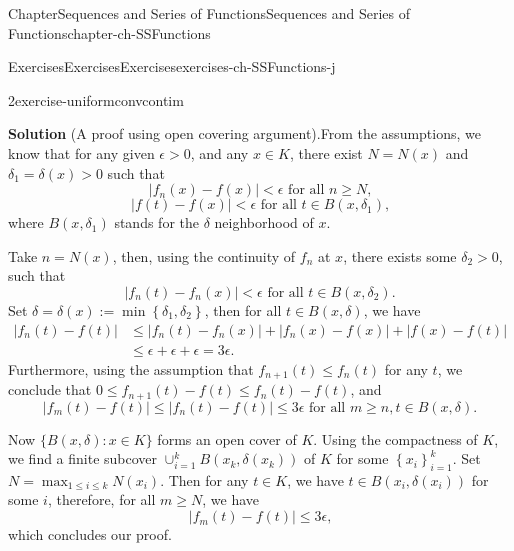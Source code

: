 \documentclass[oneside,10pt,]{book}
\newcommand{\blocktitlefont}{\relax}
\numberwithin{equation}{section}
\newcommand{\amp}{&}
\begin{document}
\begin{chapterptx}{Chapter}{Sequences and Series of Functions}{}{Sequences and Series of Functions}{}{}{chapter-ch-SSFunctions}
\begin{exercises-section}{Exercises}{Exercises}{}{Exercises}{}{}{exercises-ch-SSFunctions-j}
\begin{divisionexercise}{2}{}{}{exercise-uniformconvcontim}
\par\smallskip%
\noindent\textbf{\blocktitlefont Solution} (A  proof using open covering argument).\hypertarget{solution-uniformconvcontim-b}{}\quad{}From the assumptions, we know that for any given \(\epsilon>0\), and any \(x\in K\), there exist \(N=N(x)\) and \(\delta_{1}=\delta(x)>0\) such that%
\begin{equation*}
|f_{n}(x)-f(x)| < \epsilon \text{  for all } n\ge N\text{,}
\end{equation*}
%
\begin{equation*}
|f(t)-f(x)| < \epsilon  \text{  for all } t \in B(x, \delta_{1})\text{,}
\end{equation*}
where \(B(x, \delta_{1})\) stands for the \(\delta\) neighborhood of \(x\).%
\par
Take \(n=N(x)\), then, using the continuity of \(f_{n}\) at \(x\), there exists some \(\delta_{2}>0\), such that%
\begin{equation*}
|f_{n}(t)-f_{n}(x)| < \epsilon  \text{ for all } t \in B(x, \delta_{2})\text{.}
\end{equation*}
Set \(\delta=\delta(x) :=\min\left\{\delta_{1},\delta_{2}\right\}\), then for all \(t \in B(x, \delta)\), we have%
\begin{align*}
|f_{n}(t)-f(t)|  \amp \le |f_{n}(t)-f_{n}(x)|+|f_{n}(x)-f(x)| +|f(x)-f(t)| \\
\amp \le \epsilon + \epsilon + \epsilon = 3\epsilon \text{.}
\end{align*}
Furthermore, using the assumption that \(f_{n+1}(t)\le f_{n}(t)\) for any \(t\), we conclude that \(0\le f_{n+1}(t)-f(t)\le f_{n}(t)-f(t)\), and%
\begin{equation*}
|f_{m}(t)-f(t)|\le |f_{n}(t)-f(t)| \le 3\epsilon \text{ for all }
m\ge n, t\in  B(x, \delta)\text{.}
\end{equation*}
%
\par
Now \(\{ B(x, \delta): x \in K\}\) forms an open cover of \(K\). Using the compactness of \(K\), we find a finite subcover \(\cup_{i=1}^{k}  B(x_{k}, \delta(x_{k}))\) of \(K\) for some \(\left\{ x_{i}\right\}_{i=1}^{k}\).  Set \(N =\max_{1\le i \le k} N(x_{i})\). Then  for any \(t\in K\), we have \(t\in B(x_{i},\delta (x_{i}))\) for some \(i\), therefore, for all \(m\ge N\), we have%
\begin{equation*}
|f_{m}(t)-f(t)|\le 3\epsilon\text{,}
\end{equation*}
which concludes our proof.%
\par

\end{divisionexercise}
\end{exercises-section}
\end{chapterptx}
\end{document}
